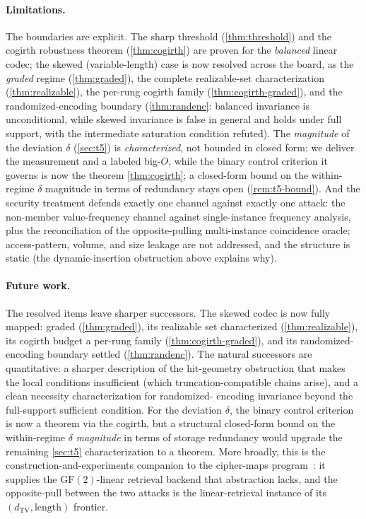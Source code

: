 \documentclass[11pt]{article}
\theoremstyle{definition}
\theoremstyle{plain}
\theoremstyle{remark}
\newcommand{\TV}{d_{\mathrm{TV}}}
\newcommand{\GF}{\mathrm{GF}(2)}
\begin{document}
\paragraph{Limitations.}
The boundaries are explicit. The sharp threshold (\cref{thm:threshold}) and the cogirth
robustness theorem (\cref{thm:cogirth}) are proven for the \emph{balanced} linear codec; the
skewed (variable-length) case is now resolved across the board, as the \emph{graded} regime
(\cref{thm:graded}), the complete realizable-set characterization (\cref{thm:realizable}), the
per-rung cogirth family (\cref{thm:cogirth-graded}), and the randomized-encoding boundary
(\cref{thm:randenc}: balanced invariance is unconditional, while skewed invariance is false in
general and holds under full support, with the intermediate saturation condition refuted). The \emph{magnitude} of the deviation
$\delta$ (\cref{sec:t5}) is \emph{characterized}, not bounded in closed form: we deliver the
measurement and a labeled big-$O$, while the binary control criterion it governs is now the
theorem \cref{thm:cogirth}; a closed-form bound on the within-regime $\delta$ magnitude in
terms of redundancy stays open (\cref{rem:t5-bound}). And the security treatment defends
exactly one channel against exactly one attack: the non-member value-frequency channel against
single-instance frequency analysis, plus the reconciliation of the opposite-pulling
multi-instance coincidence oracle; access-pattern, volume, and size leakage are not addressed,
and the structure is static (the dynamic-insertion obstruction above explains why).

\paragraph{Future work.}
The resolved items leave sharper successors. The skewed codec is now fully mapped: graded
(\cref{thm:graded}), its realizable set characterized (\cref{thm:realizable}), its cogirth
budget a per-rung family (\cref{thm:cogirth-graded}), and its randomized-encoding boundary
settled (\cref{thm:randenc}). The natural successors are quantitative: a sharper description of
the hit-geometry obstruction that makes the local conditions insufficient (which
truncation-compatible chains arise), and a clean necessity characterization for randomized-
encoding invariance beyond the full-support sufficient condition. For the
deviation $\delta$, the binary control criterion is now a theorem via the cogirth, but a
structural closed-form bound on the within-regime $\delta$ \emph{magnitude} in terms of storage
redundancy would upgrade the remaining \cref{sec:t5} characterization to a theorem. More
broadly, this is the construction-and-experiments companion to the cipher-maps
program~\cite{towell2026ciphermaps}: it supplies the $\GF$-linear retrieval backend that
abstraction lacks, and the opposite-pull between the two attacks is the linear-retrieval
instance of its $(\TV, \text{length})$ frontier.
\end{document}
